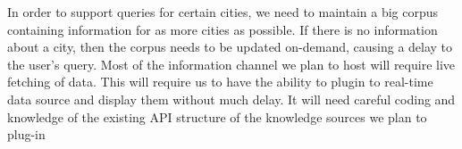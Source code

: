 In order to support queries for certain cities, we need to maintain a big corpus containing information for as more cities as possible. If there is no information about a city, then the corpus needs to be updated on-demand, causing a delay to the user’s query. Most of the information channel we plan to host will require live fetching of data. This will require us to have the ability to plugin to real-time data source and display them without much delay. It will need careful coding and knowledge of the existing API structure of the knowledge sources we plan to plug-in
